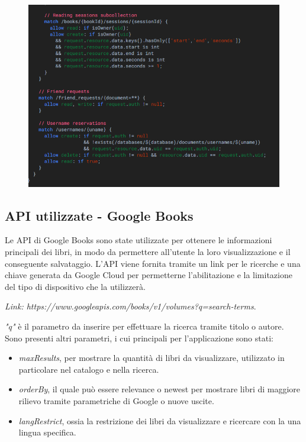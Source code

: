 \documentclass{article}
\begin{document}
\begin{itemize}
\begin{itemize}
    \begin{figure}[H]
      \centering
      \includegraphics[width=0.7\linewidth]{firebase3.png}
      \label{fig:sitemap}
    \end{figure}
  
  \end{itemize} 
\end{itemize}



\subsection{API utilizzate - Google Books}
Le API di Google Books sono state utilizzate per ottenere le informazioni principali dei libri, in modo da permettere
all'utente la loro visualizzazione e il conseguente salvataggio. L'API viene fornita tramite un link 
per le ricerche e una chiave generata da Google Cloud per permetterne l'abilitazione e la limitazione del tipo di dispositivo che la utilizzerà.

\textit{Link:  https://www.googleapis.com/books/v1/volumes?q=search-terms}.

\textit{"q"} è il parametro da inserire per effettuare la ricerca tramite titolo o autore. Sono presenti altri parametri, i cui principali per l'applicazione sono stati:
\begin{itemize}
  \item \textit{maxResults}, per mostrare la quantità di libri da visualizzare, utilizzato in particolare nel catalogo e nella ricerca.
  \item \textit{orderBy}, il quale può essere relevance o newest per mostrare libri di maggiore rilievo tramite parametriche di Google o nuove uscite.
  \item \textit{langRestrict}, ossia la restrizione dei libri da visualizzare e ricercare con la una lingua specifica.
\end{itemize}
\end{document}
